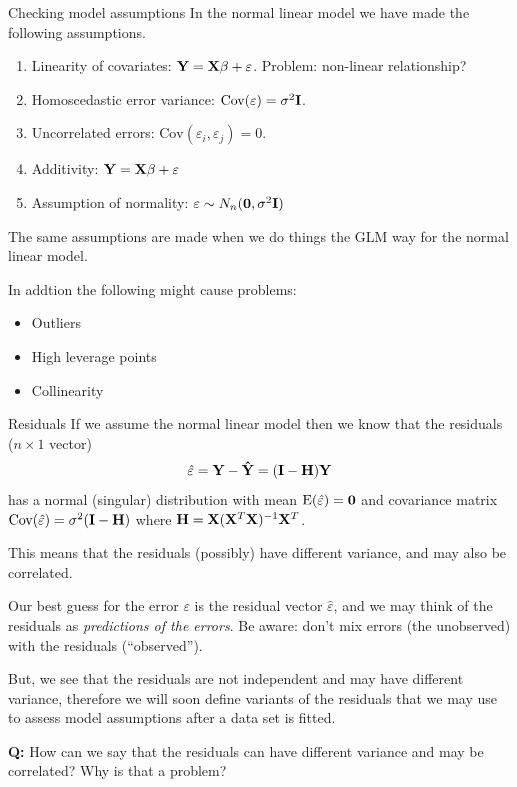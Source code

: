 \documentclass[
  ignorenonframetext,
]{beamer}
\providecommand{\tightlist}{%
  \setlength{\itemsep}{0pt}\setlength{\parskip}{0pt}}
\begin{document}
\begin{frame}{Checking model assumptions}
\label{checking-model-assumptions-1}
In the normal linear model we have made the following assumptions.

\begin{enumerate}
\item
  Linearity of covariates: \({\bf Y}={\bf X}\beta+\varepsilon\).
  Problem: non-linear relationship?
\item
  Homoscedastic error variance:
  \(\text{Cov}(\varepsilon)=\sigma^2 {\bf I}\).
\item
  Uncorrelated errors: \(\text{Cov}(\varepsilon_i,\varepsilon_j)=0\).
\item
  Additivity: \({\bf Y}={\bf X}\beta+\varepsilon\)
\item
  Assumption of normality:
  \(\varepsilon \sim N_n({\bf 0},\sigma^2{\bf I})\)
\end{enumerate}

The same assumptions are made when we do things the GLM way for the
normal linear model.

In addtion the following might cause problems:

\begin{itemize}
\tightlist
\item
  Outliers
\item
  High leverage points
\item
  Collinearity
\end{itemize}
\end{frame}

\begin{frame}
\begin{block}{Residuals}
\label{residuals}
If we assume the normal linear model then we know that the residuals
(\(n\times 1\) vector)
\[\hat{\varepsilon}={\bf Y}-{\bf \hat{Y}}=({\bf I}-{\bf H}){\bf Y}\] has
a normal (singular) distribution with mean
\(\text{E}(\hat{\varepsilon})={\bf 0}\) and covariance matrix
\(\text{Cov}(\hat{ \varepsilon})=\sigma^2({\bf I}-{\bf H})\) where
\({\bf H}={\bf X}({\bf X}^T{\bf X})^{-1}{\bf X}^T\).

This means that the residuals (possibly) have different variance, and
may also be correlated.
\end{block}
\end{frame}

\begin{frame}
Our best guess for the error \(\varepsilon\) is the residual vector
\(\hat{\varepsilon}\), and we may think of the residuals as
\emph{predictions of the errors}. Be aware: don't mix errors (the
unobserved) with the residuals (``observed'').

But, we see that the residuals are not independent and may have
different variance, therefore we will soon define variants of the
residuals that we may use to assess model assumptions after a data set
is fitted.

\textbf{Q:} How can we say that the residuals can have different
variance and may be correlated? Why is that a problem?
\end{frame}
\end{document}

